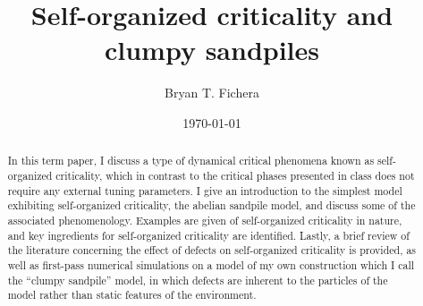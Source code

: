 \documentclass[aps,prb,reprint,superscriptaddress]{revtex4-2}
\begin{document}

\title{Self-organized criticality and clumpy sandpiles}


\author{Bryan T. Fichera}


\date{\today}

\begin{abstract}
In this term paper, I discuss a type of dynamical critical phenomena known as self-organized criticality, which in contrast to the critical phases presented in class does not require any external tuning parameters. I give an introduction to the simplest model exhibiting self-organized criticality, the abelian sandpile model, and discuss some of the associated phenomenology. Examples are given of self-organized criticality in nature, and key ingredients for self-organized criticality are identified. Lastly, a brief review of the literature concerning the effect of defects on self-organized criticality is provided, as well as first-pass numerical simulations on a model of my own construction which I call the ``clumpy sandpile'' model, in which defects are inherent to the particles of the model rather than static features of the environment.
\end{abstract}
\end{document}

